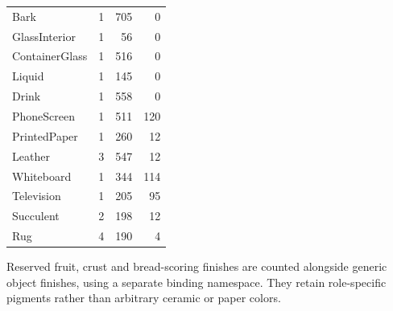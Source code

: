 \begin{longtable}{lrrr}
Bark & 1 & 705 & 0 \\
GlassInterior & 1 & 56 & 0 \\
ContainerGlass & 1 & 516 & 0 \\
Liquid & 1 & 145 & 0 \\
Drink & 1 & 558 & 0 \\
PhoneScreen & 1 & 511 & 120 \\
PrintedPaper & 1 & 260 & 12 \\
Leather & 3 & 547 & 12 \\
Whiteboard & 1 & 344 & 114 \\
Television & 1 & 205 & 95 \\
Succulent & 2 & 198 & 12 \\
Rug & 4 & 190 & 4 \\
\bottomrule
\end{longtable}
\normalsize
Reserved fruit, crust and bread-scoring finishes are counted alongside generic object finishes, using a separate binding namespace. They retain role-specific pigments rather than arbitrary ceramic or paper colors.
